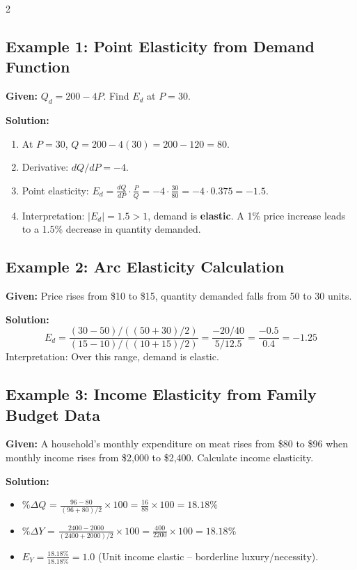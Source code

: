 \documentclass[10pt,a4paper]{article}
\begin{document}
\begin{multicols}{2}
\subsection*{Example 1: Point Elasticity from Demand Function}
\textbf{Given:} $Q_d = 200 - 4P$. Find $E_d$ at $P = 30$.

\textbf{Solution:}
\begin{enumerate}[leftmargin=*,nosep]
    \item At $P=30$, $Q = 200 - 4(30) = 200 - 120 = 80$.
    \item Derivative: $dQ/dP = -4$.
    \item Point elasticity: $E_d = \frac{dQ}{dP} \cdot \frac{P}{Q} = -4 \cdot \frac{30}{80} = -4 \cdot 0.375 = \mathbf{-1.5}$.
    \item Interpretation: $|E_d| = 1.5 > 1$, demand is \textbf{elastic}. A 1\% price increase leads to a 1.5\% decrease in quantity demanded.
\end{enumerate}

\subsection*{Example 2: Arc Elasticity Calculation}
\textbf{Given:} Price rises from \$10 to \$15, quantity demanded falls from 50 to 30 units.

\textbf{Solution:}
\[
E_d = \frac{(30 - 50) / ((50+30)/2)}{(15 - 10) / ((10+15)/2)} = \frac{-20 / 40}{5 / 12.5} = \frac{-0.5}{0.4} = \mathbf{-1.25}
\]
Interpretation: Over this range, demand is elastic.

\subsection*{Example 3: Income Elasticity from Family Budget Data}
\textbf{Given:} A household's monthly expenditure on meat rises from \$80 to \$96 when monthly income rises from \$2,000 to \$2,400. Calculate income elasticity.

\textbf{Solution:}
\begin{itemize}[leftmargin=*,nosep]
    \item \%$\Delta Q$ = $\frac{96-80}{(96+80)/2} \times 100 = \frac{16}{88} \times 100 = 18.18\%$
    \item \%$\Delta Y$ = $\frac{2400-2000}{(2400+2000)/2} \times 100 = \frac{400}{2200} \times 100 = 18.18\%$
    \item $E_Y = \frac{18.18\%}{18.18\%} = \mathbf{1.0}$ (Unit income elastic -- borderline luxury/necessity).
\end{itemize}


\end{multicols}
\end{document}
